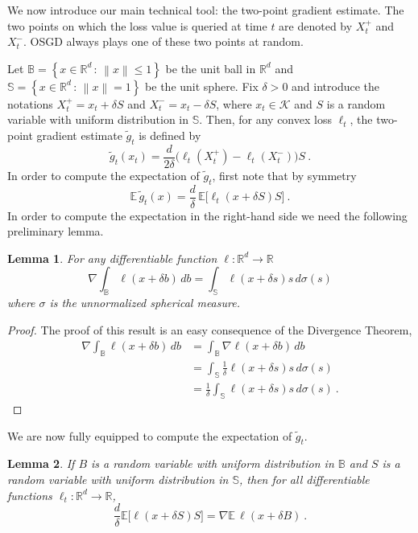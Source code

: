 \documentclass[11pt]{hackednow}
\newtheorem{lemma}{Lemma}[chapter]
\newcommand{\E}{\mathbb{E}}
\newcommand{\R}{\mathbb{R}}
\newcommand{\cK}{\mathcal{K}}
\newcommand{\theset}[2]{\left\{{#1}\,:\,{#2}\right\}}
\newcommand{\Ball}{\mathbb{B}}
\newcommand{\Sphere}{\mathbb{S}}
\newcommand{\norm}[1]{\left\|{#1}\right\|}
\newcommand{\gtilde}{\widetilde{g}}
\begin{document}
We now introduce our main technical tool: the two-point gradient estimate. The two points on which the loss value is queried at time $t$ are denoted by $X_t^+$ and $X_t^-$. OSGD always plays one of these two points at random.

Let $\Ball = \theset{x \in \R^d}{\norm{x} \le 1}$ be the unit ball in $\R^d$ and $\Sphere = \theset{x \in \R^d}{\norm{x} = 1}$ be the unit sphere.
Fix $\delta > 0$ and introduce the notations $X_t^+ = x_t + \delta S$ and $X_t^- = x_t - \delta S$, where $x_t \in \cK$ and $S$ is a random variable with uniform distribution in $\Sphere$. Then, for any convex loss $\ell_t$, the two-point gradient estimate $\gtilde_t$ is defined by
\begin{equation}
\label{eq:two-point-est}
    \gtilde_t(x_t) = \frac{d}{2\delta}\bigl(\ell_t(X_t^+) - \ell_t(X_t^-) \bigr)S~.
\end{equation}
In order to compute the expectation of $\gtilde_t$, first note that by symmetry
\[
    \E\,\gtilde_t(x) = \frac{d}{\delta}\,\E\bigl[\ell_t(x + \delta S)S\bigr]~.
\]
In order to compute the expectation in the right-hand side we need the following preliminary lemma.
%
\begin{lemma}
\label{l:divergence}
For any differentiable function $\ell : \R^d \to \R$
\[
    \nabla\int_{\Ball} \ell(x + \delta b)\,db = \int_{\Sphere} \ell(x + \delta s)s\,d\sigma(s)
\]
where $\sigma$ is the unnormalized spherical measure.
\end{lemma}
%
\begin{proof}
The proof of this result is an easy consequence of the Divergence Theorem,
\begin{align*}
    \nabla\int_{\Ball} \ell(x + \delta b)\,db
&=
    \int_{\Ball} \nabla \ell(x + \delta b)\,db
\\ &=
    \int_{\Sphere} \frac{1}{\delta} \ell(x + \delta s)s\,d \sigma(s)
\\ &=
    \frac{1}{\delta} \int_{\Sphere} \ell(x + \delta s)s\,d \sigma(s)~.
\end{align*}
\end{proof}
%
We are now fully equipped to compute the expectation of $\gtilde_t$.
%
\begin{lemma}
\label{l:stokes}
If $B$ is a random variable with uniform distribution in $\Ball$ and $S$ is a random variable with uniform distribution in $\Sphere$, then for all differentiable functions $\ell_t : \R^d\to\R$,
\[
    \frac{d}{\delta}\E\bigl[\ell(x + \delta S)S\bigr] = \nabla\E\,\ell(x + \delta B)~.
\]
\end{lemma}
\end{document}
